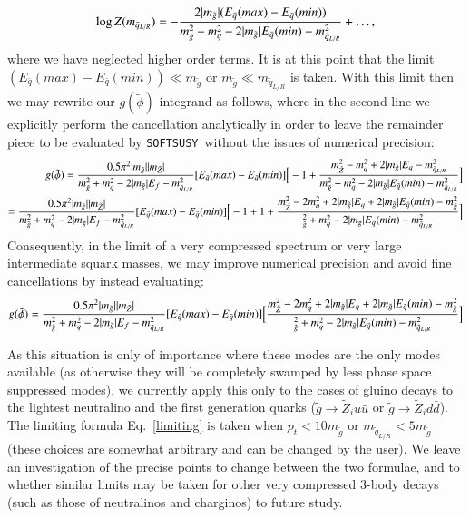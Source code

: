 \documentclass[final,3p,times]{elsarticle}
\def\SOFTSUSY{{\tt SOFTSUSY}}
\begin{document}
\begin{equation}
\log Z(m_{\tilde{q}_{L/R}}) = - {2|m_{\tilde{g}}|(E_{\bar{q}}(max) - E_{\bar{q}}(min)) \over m_{\tilde{g}}^2 + m_{q}^2 - 2|m_{\tilde{g}}|E_{\bar{q}}(min) - m_{\tilde{q}_{L/R}}^2} + \ldots,
\end{equation}
where we have neglected higher order terms.
It is at this point that the limit $(E_{\bar{q}}(max) - E_{\bar{q}}(min)) \ll
m_{\tilde{g}}$ or $m_{\tilde{g}} \ll m_{\tilde{q}_{L/R}}$ is taken. With this
limit then we may rewrite our $g(\tilde{\phi})$ integrand as follows, where in
the second line we explicitly perform the cancellation analytically in order
to leave the remainder piece to be evaluated by \SOFTSUSY~without the
issues of numerical precision: 
\begin{equation}
\begin{split}
g(\tilde{\phi}) = {0.5 \pi^2 |m_{\tilde{g}}||m_{\tilde{Z}}| \over m_{\tilde{g}}^2 + m_{q}^2 - 2|m_{\tilde{g}}|E_f-m_{\tilde{q}_{L/R}}^2}[E_{\bar{q}}(max) - E_{\bar{q}}(min)] \Big[-1+{m_{\tilde{Z}}^2 - m_{q}^2 + 2|m_{\tilde{g}}|E_q - m_{\tilde{q}_{L/R}}^2 \over m_{\tilde{g}}^2+m_q^2-2|m_{\tilde{g}}|E_{\bar{q}}(min)-m_{\tilde{q}_{L/R}}^2}\Big] \\ = {0.5 \pi^2 |m_{\tilde{g}}||m_{\tilde{Z}}| \over m_{\tilde{g}}^2 + m_{q}^2 - 2|m_{\tilde{g}}|E_f-m_{\tilde{q}_{L/R}}^2}[E_{\bar{q}}(max) - E_{\bar{q}}(min)] \Big[-1+1+{m_{\tilde{Z}}^2-2m_q^2 + 2|m_{\tilde{g}}|E_q+2|m_{\tilde{g}}|E_{\bar{q}}(min)-m_{\tilde{g}}^2 \over _{\tilde{g}}^2+m_q^2-2|m_{\tilde{g}}|E_{\bar{q}}(min)-m_{\tilde{q}_{L/R}}^2}\Big]
\end{split}
\end{equation}
Consequently, in the limit of a very compressed spectrum or very large intermediate squark masses, we may improve numerical precision and avoid fine cancellations by instead evaluating:
\begin{equation}
g(\tilde{\phi}) = {0.5 \pi^2 |m_{\tilde{g}}||m_{\tilde{Z}}| \over
  m_{\tilde{g}}^2 + m_{q}^2 -
  2|m_{\tilde{g}}|E_f-m_{\tilde{q}_{L/R}}^2}[E_{\bar{q}}(max) -
E_{\bar{q}}(min)] \Big[{m_{\tilde{Z}}^2-2m_q^2 +
  2|m_{\tilde{g}}|E_q+2|m_{\tilde{g}}|E_{\bar{q}}(min)-m_{\tilde{g}}^2 \over
  _{\tilde{g}}^2+m_q^2-2|m_{\tilde{g}}|E_{\bar{q}}(min)-m_{\tilde{q}_{L/R}}^2}\Big] \label{limiting}
\end{equation}

As this situation is only of importance where these modes are the only modes
available (as otherwise they will be completely swamped by less phase space
suppressed modes), we currently apply this only to the cases of gluino decays
to the lightest neutralino and the first generation quarks ($\tilde{g}
\rightarrow \tilde{Z}_i u\bar{u}$ or $\tilde{g} \rightarrow \tilde{Z}_i
d\bar{d}$). The limiting formula Eq.~\ref{limiting} is taken when $p_t < 10
m_{\tilde{g}}$ or $m_{\tilde{q}_{L/R}} < 5 m_{\tilde{g}}$ (these choices are somewhat
arbitrary and can be changed by the user). We leave an investigation of the
precise points to change between the two formulae, and to whether similar
limits may be taken for other very compressed 3-body decays (such as those of
neutralinos and charginos) to future study. 
\end{document}
